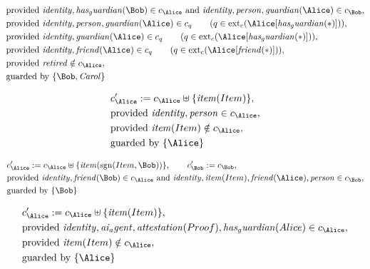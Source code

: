 \begin{align*}
&
\text{provided } 
\mathit{
identity
}
,
\mathit{
has_guardian
}
(
\Bob
)
 \in c_
{
\Alice
}
 \text{ and } 
\mathit{
identity
}
,
\mathit{
person
}
,
\mathit{
guardian
}
(
\Alice
)
 \in c_
{
\Bob
}
,\\
&
\text{provided } 
\mathit{
identity
}
,
\mathit{
person
}
,
\mathit{
guardian
}
(
\Alice
)
 \in c_
q
 \qquad (
q \in 
\mathrm{ext}_c(
\Alice
[
\mathit{
has_guardian
}
(
\ast
)
]
)
)
,\\
&
\text{provided } 
\mathit{
identity
}
,
\mathit{
guardian
}
(
\Alice
)
 \in c_
q
 \qquad (
q \in 
\mathrm{ext}_c(
\Alice
[
\mathit{
has_guardian
}
(
\ast
)
]
)
)
,\\
&
\text{provided } 
\mathit{
identity
}
,
\mathit{
friend
}
(
\Alice
)
 \in c_
q
 \qquad (
q \in 
\mathrm{ext}_c(
\Alice
[
\mathit{
friend
}
(
\ast
)
]
)
)
,\\
&
\text{provided } 
\mathit{
retired
}
 \notin c_
{
\Alice
}
,\\
&
\text{guarded by } \{
\Bob
,
\mathit{Carol}
\}
\end{align*}

\begin{align*}
&
c'_
{
\Alice
}
 := 
c_
{
\Alice
}
 \uplus 
\{
\mathit{
item
}
(
Item
)
\}
,\\
&
\text{provided } 
\mathit{
identity
}
,
\mathit{
person
}
 \in c_
{
\Alice
}
,\\
&
\text{provided } 
\mathit{
item
}
(
Item
)
 \notin c_
{
\Alice
}
,\\
&
\text{guarded by } \{
\Alice
\}
\end{align*}

\begin{align*}
&
c'_
{
\Alice
}
 := 
c_
{
\Alice
}
 \uplus 
\{
\mathit{
item
}
(
\mathrm{sgn}(
Item
,
\Bob
)
)
\}
, \qquad 
c'_
{
\Bob
}
 := 
c_
{
\Bob
}
,\\
&
\text{provided } 
\mathit{
identity
}
,
\mathit{
friend
}
(
\Bob
)
 \in c_
{
\Alice
}
 \text{ and } 
\mathit{
identity
}
,
\mathit{
item
}
(
Item
)
,
\mathit{
friend
}
(
\Alice
)
,
\mathit{
person
}
 \in c_
{
\Bob
}
,\\
&
\text{guarded by } \{
\Bob
\}
\end{align*}

\begin{align*}
&
c'_
{
\Alice
}
 := 
c_
{
\Alice
}
 \uplus 
\{
\mathit{
item
}
(
Item
)
\}
,\\
&
\text{provided } 
\mathit{
identity
}
,
\mathit{
ai_agent
}
,
\mathit{
attestation
}
(
Proof
)
,
\mathit{
has_guardian
}
(
Alice
)
 \in c_
{
\Alice
}
,\\
&
\text{provided } 
\mathit{
item
}
(
Item
)
 \notin c_
{
\Alice
}
,\\
&
\text{guarded by } \{
\Alice
\}
\end{align*}
